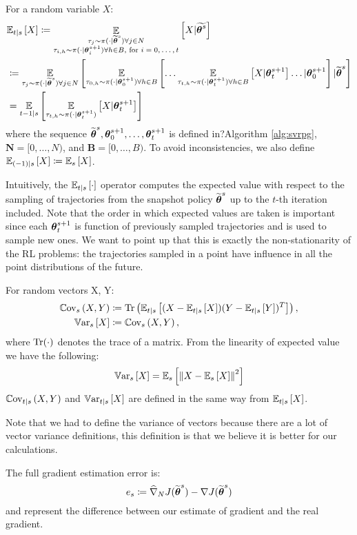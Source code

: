 \begin{definition}
	For a random variable $X$:
	\begin{align*}
	&\mathbb{E}_{t\vert s}\left[X\right] \coloneqq 
	\mathop{\mathbb{E}}_{\substack{\tau_j\sim\pi(\cdot\vert\wt{\vtheta}^s)\forall j \in N \\ \tau_{i,h}\sim\pi(\cdot\vert\vtheta^{s+1}_i) \forall h \in B, \text{ for $i=0,\dots,t$}}}{\left[X \vert \wt{\vtheta^s}\right]} \\
	&\coloneqq \EVV[\tau_j\sim\pi(\cdot\vert\wt{\vtheta}^s)\forall j \in N]{
		\EVV[\tau_{0,h}\sim\pi(\cdot\vert\vtheta_0^{s+1}) \forall h \in B]
		{\dots
			\EVV[\tau_{t,h}\sim\pi(\cdot\vert\vtheta_t^{s+1})\forall h \in B]
			{X\vert\vtheta_t^{s+1}}
			\dots
			\vert\vtheta_0^{s+1}}
		\vert\wt{\vtheta}^s}\\
	&= \EVV[t-1|s]{\EVV[\tau_{t,h}\sim \pi(\cdot|\vtheta^{s+1}_t)]{X|\vtheta^{s+1}_t}}
	\end{align*}
	where the sequence $\wt{\vtheta}^s,\vtheta_0^{s+1},\dots,\vtheta_t^{s+1}$ is defined in?Algorithm \ref{alg:svrpg}, $\mathbf{N} = [0,\dots,N)$, and $\mathbf{B} = [0,\dots,B)$. To avoid inconsistencies, we also define $\Ets[(-1)]{X} \coloneqq \Es{X}$.
	
\end{definition}

Intuitively, the $\Ets{\cdot}$ operator computes the expected value with respect to the sampling of trajectories from the snapshot policy $\wt{\vtheta}^s$ up to the $t$-th iteration included. Note that the order in which expected values are taken is important since each $\vtheta_{t}^{s+1}$ is function of previously sampled trajectories and is used to sample new ones.
We want to point up that this is exactly the non-stationarity of the \acs{RL} problems: the trajectories sampled in a point have influence in all the point distributions of the future.

\begin{definition}\label{def:var}
	For random vectors X, Y:
	\begin{align*}
	\Covs{X}{Y} &\coloneqq \Tr\left(\Ets{(X-\Ets{X})(Y-\Ets{Y})^T}\right), \\
	\Vars{X} &\coloneqq \Covs{X}{Y},
	\end{align*}
	where $\Tr(\cdot)$ denotes the trace of a matrix. From the linearity of expected value we have the following:
	\begin{equation}\label{neweq:1}
	\Vars{X} = \Es{\norm[]{X-\Es{X}}^2}
	\end{equation}
	$\Covts[t]{X}{Y}$ and $\Varts[t]{X}$ are defined in the same way from $\Ets[t]{X}$.
\end{definition}
Note that we had to define the variance of vectors because there are a lot of vector variance definitions, this definition is that we  believe it is better for our calculations. 
\begin{definition}
	The full gradient estimation error is:
	\[
	e_s \coloneqq \gradApp{\wt{\vtheta}^s}{N} - \gradJ{\wt{\vtheta}^s} 
	\]
	and represent the difference between our estimate of gradient and the real gradient.
\end{definition}

